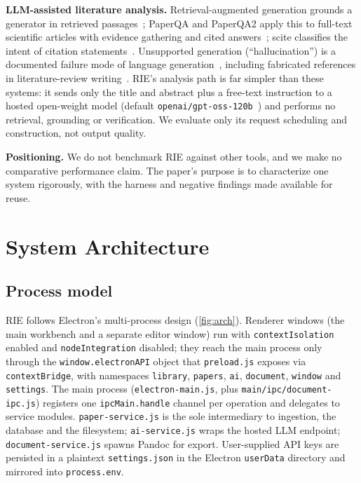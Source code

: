 \documentclass[conference]{IEEEtran}
\newcommand{\code}[1]{\texttt{\small #1}}
\newcommand{\RIE}{RIE}
\begin{document}
\textbf{LLM-assisted literature analysis.} Retrieval-augmented generation grounds a generator in retrieved passages~\cite{lewis2020retrieval,gao2023retrieval}; PaperQA and PaperQA2 apply this to full-text scientific articles with evidence gathering and cited answers~\cite{lala2023paperqa,skarlinski2024language}; scite classifies the intent of citation statements~\cite{nicholson2021scite}. Unsupported generation (``hallucination'') is a documented failure mode of language generation~\cite{ji2023survey}, including fabricated references in literature-review writing~\cite{tang2024llmreview}. \RIE's analysis path is far simpler than these systems: it sends only the title and abstract plus a free-text instruction to a hosted open-weight model (default \code{openai/gpt-oss-120b}~\cite{openai2025gptoss}) and performs no retrieval, grounding or verification. We evaluate only its request scheduling and construction, not output quality.

\textbf{Positioning.} We do not benchmark \RIE{} against other tools, and we make no comparative performance claim. The paper's purpose is to characterize one system rigorously, with the harness and negative findings made available for reuse.

\section{System Architecture}
\label{sec:arch}

\subsection{Process model}
\RIE{} follows Electron's multi-process design (\cref{fig:arch}). Renderer windows (the main workbench and a separate editor window) run with \code{contextIsolation} enabled and \code{nodeIntegration} disabled; they reach the main process only through the \code{window.electronAPI} object that \code{preload.js} exposes via \code{contextBridge}, with namespaces \code{library}, \code{papers}, \code{ai}, \code{document}, \code{window} and \code{settings}. The main process (\code{electron-main.js}, plus \code{main/ipc/document-ipc.js}) registers one \code{ipcMain.handle} channel per operation and delegates to service modules. \code{paper-service.js} is the sole intermediary to ingestion, the database and the filesystem; \code{ai-service.js} wraps the hosted LLM endpoint; \code{document-service.js} spawns Pandoc for export. User-supplied API keys are persisted in a plaintext \code{settings.json} in the Electron \code{userData} directory and mirrored into \code{process.env}.
\end{document}
